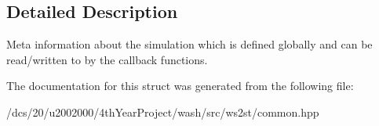 \subsection{Detailed Description}
Meta information about the simulation which is defined globally and can be read/written to by the callback functions. 

The documentation for this struct was generated from the following file\+:\begin{DoxyCompactItemize}
\item 
/dcs/20/u2002000/4th\+Year\+Project/wash/src/ws2st/common.\+hpp\end{DoxyCompactItemize}
